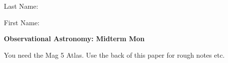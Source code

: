 \documentclass[11pt]{article}
\begin{document}
\def\arcsec{\ifmmode {^{\scriptscriptstyle\prime\prime}}
          \else $^{\scriptscriptstyle\prime\prime}$\fi}
\def\arcmin{\ifmmode {^{\scriptscriptstyle\prime}}
          \else $^{\scriptscriptstyle\prime}$\fi}
\def\deg{\ifmmode^\circ\else$^\circ$\fi}



{ \hfill Last Name:\,\makebox[6cm]{\hrulefill}}

{ \hfill First Name:\,\makebox[6cm]{\hrulefill}}

\vskip 0.8cm
\begin{center}
{\large \bf Observational Astronomy: Midterm Mon} \\
\end{center}

\noindent You need the Mag 5 Atlas.
Use the back of this paper for rough notes etc.  
\end{document}
